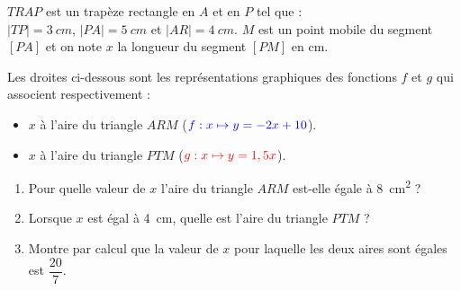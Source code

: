 \documentclass[../partie2.tex]{subfiles}
\begin{document}
\begin{exercise}[points=3]
    \begin{minipage}{.48\linewidth}
        
    \end{minipage}
    \begin{minipage}{.48\linewidth}
        $TRAP$ est un trapèze rectangle en $A$ et en $P$ tel que :\\
    $|TP| = \SI{3}{cm}$, $|PA| = \SI{5}{cm}$ et $|AR|=\SI{4}{cm}$.\medbreak
    $M$ est un point mobile du segment $[PA]$ et on note $x$ la longueur du segment $[PM]$ en cm.
    \end{minipage}


    Les droites ci-dessous sont les représentations graphiques des fonctions $f$ et $g$ qui associent respectivement :
    \begin{itemize}[label=]
        \item $x$ à l'aire du triangle $ARM$ ($\color{blue}f:x\mapsto y= -2x+10$).
        \item $x$ à l'aire du triangle $PTM$ ($\color{red}g:x\mapsto y=1,5x$).
    \end{itemize}

    

    \begin{enumerate}[resume=mine]
        \item Pour quelle valeur de $x$ l'aire du triangle $ARM$ est-elle égale à \SI{8}{cm^2} ?
        \item Lorsque $x$ est égal à \SI{4}{cm}, quelle est l'aire du triangle $PTM$ ?
        \item Montre par calcul que la valeur de $x$ pour laquelle les deux aires sont égales est $\dfrac{20}{7}$.
    \end{enumerate}
\end{exercise}
\end{document}

